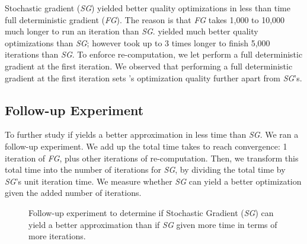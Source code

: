 Stochastic gradient (\emph{SG}) yielded better quality optimizations in less than time full deterministic gradient (\emph{FG}).
The reason is that \emph{FG} takes 1,000 to 10,000 much longer to run an iteration than \emph{SG}.
\tool yielded much better quality optimizations than \emph{SG}; however \tool took up to 3 times longer to finish 5,000 iterations than \emph{SG}.
To enforce re-computation, we let \tool perform a full deterministic gradient at the first iteration.  
We observed that performing a full deterministic gradient at the first iteration sets \tool's optimization quality further apart from \emph{SG}'s.



\subsection{Follow-up Experiment}
To further study if \tool yields a better approximation in less time than \emph{SG}.  We ran a follow-up experiment.
We add up the total time \tool takes to reach convergence: 1 iteration of \emph{FG}, plus other iterations of re-computation.
Then, we transform this total time into the number of iterations for \emph{SG}, by dividing the total time by \emph{SG}'s unit iteration time. 
We measure whether \emph{SG} can yield a better optimization given the added number of iterations.  

\begin{figure}
\centerline{}
\caption[Follow-up Experiment]{Follow-up experiment to determine if Stochastic Gradient (\emph{SG}) can yield a better approximation than \tool if \emph{SG} given more time in terms of more iterations.}
\label{table:followup}
\end{figure}


